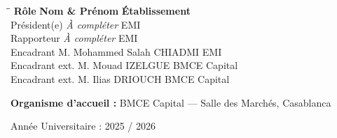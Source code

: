 \begin{titlepage}
\begin{center}
\begin{tabbing}
\hspace{3.2cm}\=\hspace{7cm}\=\kill
\textbf{Rôle} \> \textbf{Nom \& Prénom} \> \textbf{Établissement} \\
Président(e)   \> \textit{À compléter}      \> EMI \\
Rapporteur     \> \textit{À compléter}      \> EMI \\
Encadrant      \> M. Mohammed Salah CHIADMI \> EMI \\
Encadrant ext. \> M. Mouad IZELGUE          \> BMCE Capital \\
Encadrant ext. \> M. Ilias DRIOUCH          \> BMCE Capital
\end{tabbing}

\vspace{0.8cm}

\textbf{Organisme d'accueil :} BMCE Capital — Salle des Marchés, Casablanca

\vspace{0.6cm}

{\normalsize Année Universitaire : 2025 / 2026}

\end{center}
\end{titlepage}
\newpage
